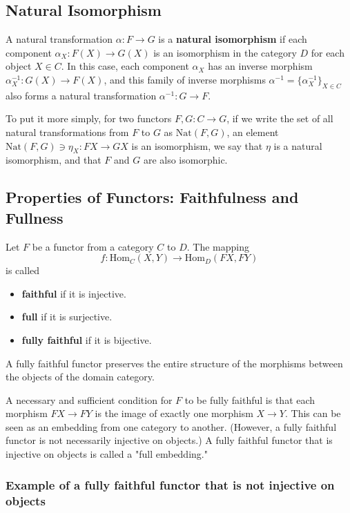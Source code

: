\documentclass[uplatex,a4j,12pt,dvipdfmx]{jsarticle}
\begin{document}
\subsection{Natural Isomorphism}
A natural transformation $\alpha: F \to G$ is a \textbf{natural isomorphism} if each component $\alpha_X: F(X) \to G(X)$ is an isomorphism in the category $D$ for each object $X \in C$.
In this case, each component $\alpha_X$ has an inverse morphism $\alpha_X^{-1}: G(X) \to F(X)$, and this family of inverse morphisms $\alpha^{-1} = \{\alpha_X^{-1}\}_{X \in C}$ also forms a natural transformation $\alpha^{-1}: G \to F$.

To put it more simply,
for two functors $F,G: C \to G$, if we write the set of all natural transformations from $F$ to $G$ as $\text{Nat}(F,G)$, an element $\text{Nat}(F,G) \ni \eta_{X} : FX \to GX$ is an isomorphism, we say that $\eta$ is a natural isomorphism, and that $F$ and $G$ are also isomorphic.




\subsection{Properties of Functors: Faithfulness and Fullness}

Let $F$ be a functor from a category $C$ to $D$.
The mapping
$$
	f : \text{Hom}_{C}(X,Y) \to \text{Hom}_{D}(FX,FY)
$$
is called
\begin{itemize}
	\item \textbf{faithful} if it is injective.
	\item \textbf{full} if it is surjective.
	\item \textbf{fully faithful} if it is bijective.
\end{itemize}

A fully faithful functor preserves the entire structure of the morphisms between the objects of the domain category.

A necessary and sufficient condition for $F$ to be fully faithful is that each morphism $FX \to FY$ is the image of exactly one morphism $X \to Y$.
This can be seen as an embedding from one category to another.
(However, a fully faithful functor is not necessarily injective on objects.)
A fully faithful functor that is injective on objects is called a "full embedding."


\subsubsection{Example of a fully faithful functor that is not injective on objects}
\end{document}
